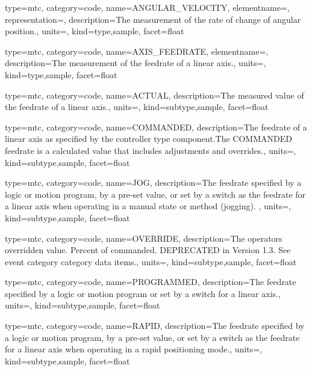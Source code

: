 {
  type=mtc,
  category=code,
  name={ANGULAR\_VELOCITY},
  elementname=,
  representation=,
  description={The measurement of the rate of change of angular position.},
  units=,
  kind={type,sample},
  facet={\gls{float}}
}


{
  type=mtc,
  category=code,
  name={AXIS\_FEEDRATE},
  elementname=,
  description={The measurement of the feedrate of a linear axis.},
  units=,
  kind={type,sample},
  facet={\gls{float}}
}


{
  type=mtc,
  category=code,
  name={ACTUAL},
  description={The measured value of the feedrate of a linear axis.},
  units=,
  kind={subtype,sample},
  facet={\gls{float}}
}


{
  type=mtc,
  category=code,
  name={COMMANDED},
  description={The feedrate of a linear axis as specified by the \gls{controller} type component.The COMMANDED feedrate is a calculated value that includes adjustments and overrides.},
  units=,
  kind={subtype,sample},
  facet={\gls{float}}
}


{
  type=mtc,
  category=code,
  name={JOG},
  description={The feedrate specified by a logic or motion program, by a pre-set value, or set by a switch as the feedrate for a linear axis when operating in a manual state or method (jogging).  },
  units=,
  kind={subtype,sample},
  facet={\gls{float}}
}


{
  type=mtc,
  category=code,
  name={OVERRIDE},
  description={The operators overridden value. Percent of commanded.  DEPRECATED in Version 1.3.   See \gls{event category} category data items.},
  units=,
  kind={subtype,sample},
  facet={\gls{float}}
}


{
  type=mtc,
  category=code,
  name={PROGRAMMED},
  description={The feedrate specified by a logic or motion program or set by a switch for a linear axis.},
  units=,
  kind={subtype,sample},
  facet={\gls{float}}
}


{
  type=mtc,
  category=code,
  name={RAPID},
  description={The feedrate specified by a logic or motion program, by a pre-set value, or set by a switch as the feedrate for a linear axis when operating in a rapid positioning mode.},
  units=,
  kind={subtype,sample},
  facet={\gls{float}}
}


